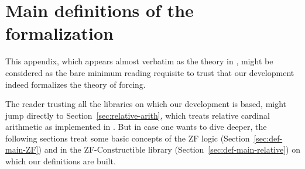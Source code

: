 \section{Main definitions of the formalization}\label{sec:definitions_main}

This appendix, which appears almost verbatim as
the theory  in \cite{Independence_CH-AFP},
might be considered as the bare minimum reading requisite to
trust that our development indeed formalizes the theory of
forcing.

The reader trusting
all the libraries on which our development is based, might jump
directly to Section~\ref{sec:relative-arith}, which treats relative
cardinal arithmetic as implemented in
. But in case one wants to dive deeper, the
following sections treat some basic concepts of the ZF logic
(Section~\ref{sec:def-main-ZF}) and in the
ZF-Constructible library (Section~\ref{sec:def-main-relative})
on which our definitions are built.

